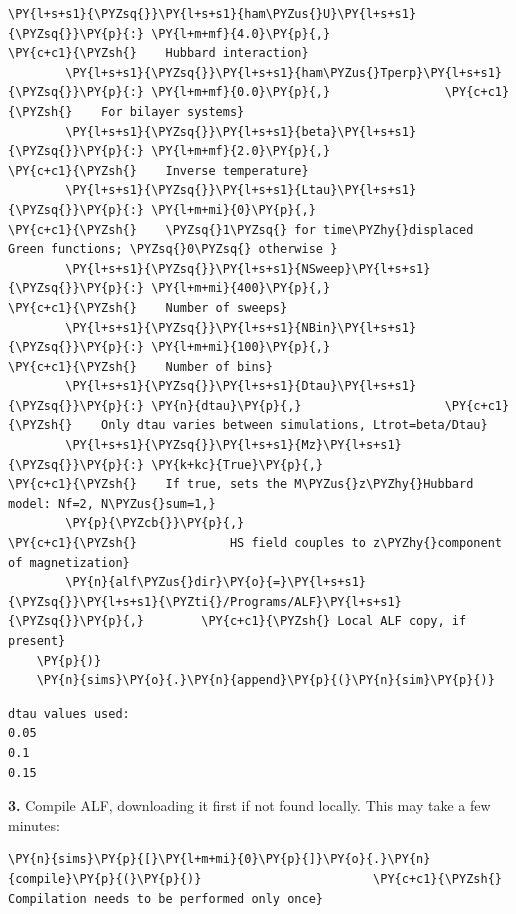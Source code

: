 \begin{tcolorbox}[breakable, size=fbox, boxrule=1pt, pad at break*=1mm,colback=cellbackground, colframe=cellborder]
\begin{Verbatim}[commandchars=\\\{\}]
        \PY{l+s+s1}{\PYZsq{}}\PY{l+s+s1}{ham\PYZus{}U}\PY{l+s+s1}{\PYZsq{}}\PY{p}{:} \PY{l+m+mf}{4.0}\PY{p}{,}                    \PY{c+c1}{\PYZsh{}    Hubbard interaction}
        \PY{l+s+s1}{\PYZsq{}}\PY{l+s+s1}{ham\PYZus{}Tperp}\PY{l+s+s1}{\PYZsq{}}\PY{p}{:} \PY{l+m+mf}{0.0}\PY{p}{,}                \PY{c+c1}{\PYZsh{}    For bilayer systems}
        \PY{l+s+s1}{\PYZsq{}}\PY{l+s+s1}{beta}\PY{l+s+s1}{\PYZsq{}}\PY{p}{:} \PY{l+m+mf}{2.0}\PY{p}{,}                     \PY{c+c1}{\PYZsh{}    Inverse temperature}
        \PY{l+s+s1}{\PYZsq{}}\PY{l+s+s1}{Ltau}\PY{l+s+s1}{\PYZsq{}}\PY{p}{:} \PY{l+m+mi}{0}\PY{p}{,}                       \PY{c+c1}{\PYZsh{}    \PYZsq{}1\PYZsq{} for time\PYZhy{}displaced Green functions; \PYZsq{}0\PYZsq{} otherwise }
        \PY{l+s+s1}{\PYZsq{}}\PY{l+s+s1}{NSweep}\PY{l+s+s1}{\PYZsq{}}\PY{p}{:} \PY{l+m+mi}{400}\PY{p}{,}                   \PY{c+c1}{\PYZsh{}    Number of sweeps}
        \PY{l+s+s1}{\PYZsq{}}\PY{l+s+s1}{NBin}\PY{l+s+s1}{\PYZsq{}}\PY{p}{:} \PY{l+m+mi}{100}\PY{p}{,}                     \PY{c+c1}{\PYZsh{}    Number of bins}
        \PY{l+s+s1}{\PYZsq{}}\PY{l+s+s1}{Dtau}\PY{l+s+s1}{\PYZsq{}}\PY{p}{:} \PY{n}{dtau}\PY{p}{,}                    \PY{c+c1}{\PYZsh{}    Only dtau varies between simulations, Ltrot=beta/Dtau}
        \PY{l+s+s1}{\PYZsq{}}\PY{l+s+s1}{Mz}\PY{l+s+s1}{\PYZsq{}}\PY{p}{:} \PY{k+kc}{True}\PY{p}{,}                      \PY{c+c1}{\PYZsh{}    If true, sets the M\PYZus{}z\PYZhy{}Hubbard model: Nf=2, N\PYZus{}sum=1,}
        \PY{p}{\PYZcb{}}\PY{p}{,}                               \PY{c+c1}{\PYZsh{}             HS field couples to z\PYZhy{}component of magnetization}
        \PY{n}{alf\PYZus{}dir}\PY{o}{=}\PY{l+s+s1}{\PYZsq{}}\PY{l+s+s1}{\PYZti{}/Programs/ALF}\PY{l+s+s1}{\PYZsq{}}\PY{p}{,}        \PY{c+c1}{\PYZsh{} Local ALF copy, if present}
    \PY{p}{)}
    \PY{n}{sims}\PY{o}{.}\PY{n}{append}\PY{p}{(}\PY{n}{sim}\PY{p}{)}
\end{Verbatim}
\end{tcolorbox}

    \begin{Verbatim}[commandchars=\\\{\}]
dtau values used:
0.05
0.1
0.15
    \end{Verbatim}

    \textbf{3.} Compile ALF, downloading it first if not found locally. This
may take a few minutes:

    \begin{tcolorbox}[breakable, size=fbox, boxrule=1pt, pad at break*=1mm,colback=cellbackground, colframe=cellborder]
\begin{Verbatim}[commandchars=\\\{\}]
\PY{n}{sims}\PY{p}{[}\PY{l+m+mi}{0}\PY{p}{]}\PY{o}{.}\PY{n}{compile}\PY{p}{(}\PY{p}{)}                        \PY{c+c1}{\PYZsh{} Compilation needs to be performed only once}
\end{Verbatim}
\end{tcolorbox}

